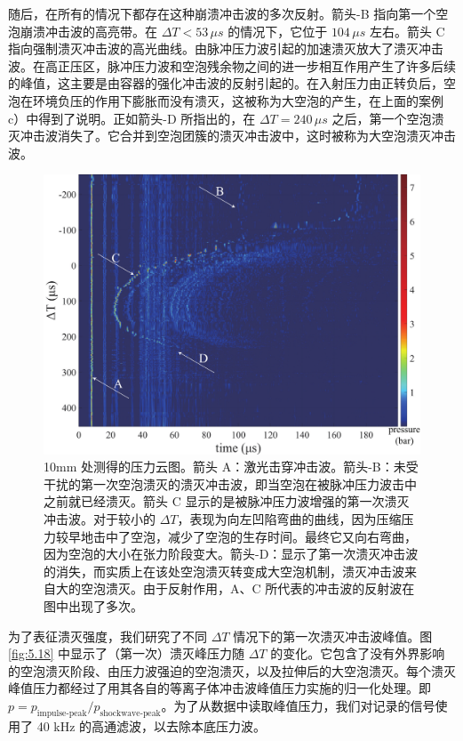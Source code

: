 随后，在所有的情况下都存在这种崩溃冲击波的多次反射。箭头-B
指向第一个空泡崩溃冲击波的高亮带。在 $\Delta T<53\,\mu s$
的情况下，它位于 $104\,\mu s$ 左右。箭头 C
指向强制溃灭冲击波的高光曲线。由脉冲压力波引起的加速溃灭放大了溃灭冲击波。在高正压区，脉冲压力波和空泡残余物之间的进一步相互作用产生了许多后续的峰值，这主要是由容器的强化冲击波的反射引起的。在入射压力由正转负后，空泡在环境负压的作用下膨胀而没有溃灭，这被称为大空泡的产生，在上面的案例
c）中得到了说明。正如箭头-D 所指出的，在 $\Delta T=240\,\mu s$
之后，第一个空泡溃灭冲击波消失了。它合并到空泡团簇的溃灭冲击波中，这时被称为大空泡溃灭冲击波。

\begin{figure}[H]
  \centering
  \includegraphics[width=0.8\linewidth]{img/fig5.17.pdf}
  \caption[10mm 处测得的压力云图]{10mm 处测得的压力云图。箭头
A：激光击穿冲击波。箭头-B：未受干扰的第一次空泡溃灭的溃灭冲击波，即当空泡在被脉冲压力波击中之前就已经溃灭。箭头
C 显示的是被脉冲压力波增强的第一次溃灭冲击波。对于较小的
$\Delta T$，表现为向左凹陷弯曲的曲线，因为压缩压力较早地击中了空泡，减少了空泡的生存时间。最终它又向右弯曲，因为空泡的大小在张力阶段变大。箭头-D：显示了第一次溃灭冲击波的消失，而实质上在该处空泡溃灭转变成大空泡机制，溃灭冲击波来自大的空泡溃灭。由于反射作用，A、C
所代表的冲击波的反射波在图中出现了多次。}
  \label{fig:5.17}
\end{figure}




为了表征溃灭强度，我们研究了不同 $\Delta T$
情况下的第一次溃灭冲击波峰值。图 \ref{fig:5.18} 中显示了（第一次）溃灭峰压力随
$\Delta T$
的变化。它包含了没有外界影响的空泡溃灭阶段、由压力波强迫的空泡溃灭，以及拉伸后的大空泡溃灭。每个溃灭峰值压力都经过了用其各自的等离子体冲击波峰值压力实施的归一化处理。即
$p=p_\text{impulse-peak}/p_\text{shockwave-peak}$。为了从数据中读取峰值压力，我们对记录的信号使用了
40 kHz 的高通滤波，以去除本底压力波。

